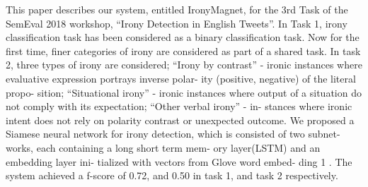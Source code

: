 This paper describes our system, entitled IronyMagnet, for the 3rd Task of the SemEval 2018 workshop, ``Irony Detection in English Tweets''. In Task 1, irony classification task has been considered as a binary classification task. Now for the first time, finer categories of irony are considered as part of a shared task. In task 2, three types of irony are considered; ``Irony by contrast'' - ironic instances where evaluative expression portrays inverse polar- ity (positive, negative) of the literal propo- sition; ``Situational irony'' - ironic instances where output of a situation do not comply with its expectation; ``Other verbal irony'' - in- stances where ironic intent does not rely on polarity contrast or unexpected outcome. We proposed a Siamese neural network for irony detection, which is consisted of two subnet- works, each containing a long short term mem- ory layer(LSTM) and an embedding layer ini- tialized with vectors from Glove word embed- ding 1 . The system achieved a f-score of 0.72, and 0.50 in task 1, and task 2 respectively.
